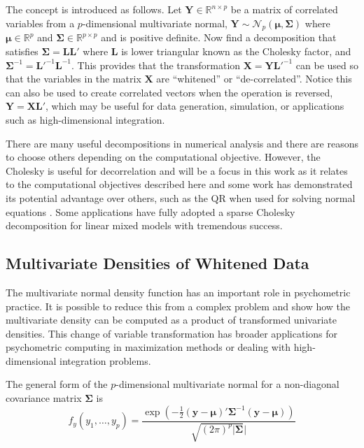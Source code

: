\documentclass[12pt]{article}
\begin{document}
The concept is introduced as follows. Let $\bm{Y} \in \mathbb{R}^{n \times p}$ be a matrix of correlated variables from a $p$-dimensional multivariate normal, $\bm{Y} \sim \mathcal{N}_p(\bm{\mu}, \bm{\Sigma})$ where $\bm{\mu} \in \mathbb{R}^{p}$ and $\bm{\Sigma} \in \mathbb{R}^{p \times p}$ and is positive definite. Now find a decomposition that satisfies $\bm{\Sigma} = \bm{L}\bm{L}'$ where $\bm{L}$ is lower triangular known as the Cholesky factor, and $\bm{\Sigma}^{-1} = \bm{L'}^{-1}\bm{L}^{-1}$. This provides that the transformation $\bm{X} = \bm{Y}\bm{L}'^{-1}$ can be used so that the variables in the matrix $\bm{X}$ are ``whitened'' or ``de-correlated''. Notice this can also be used to create correlated vectors when the operation is reversed, $\bm{Y}= \bm{X}\bm{L}'$, which may be useful for data generation, simulation, or applications such as high-dimensional integration. 

There are many useful decompositions in numerical analysis \cite{searle:1982,zhang:matrix} and there are reasons to choose others depending on the computational objective. However, the Cholesky is useful for decorrelation and will be a focus in this work as it relates to the computational objectives described here and some work has demonstrated its potential advantage over others, such as the QR when used for solving normal equations \cite{qr:chol}. Some applications have fully adopted a sparse Cholesky decomposition \cite{tim:davis} for linear mixed models \cite{bates:2004} with tremendous success.  

\subsection*{Multivariate Densities of Whitened Data}

The multivariate normal density function has an important role in psychometric practice. It is possible to reduce this from a complex problem and show how the multivariate density can be computed as a product of transformed univariate densities. This change of variable transformation has broader applications for psychometric computing in maximization methods or dealing with high-dimensional integration problems. 

The general form of the $p$-dimensional multivariate normal for a non-diagonal covariance matrix $\bm{\Sigma}$ is
\begin{equation}
\label{eqn:multivariate}
f_y(y_1, \ldots, y_p)  =  \frac{\exp(-\frac{1}{2}(\bm{y} - \bm{\mu})'\bm{\Sigma}^{-1}(\bm{y} - \bm{\mu}))}{\sqrt{(2\pi)^p|\bm{\Sigma}}|}
\end{equation}
\end{document}
